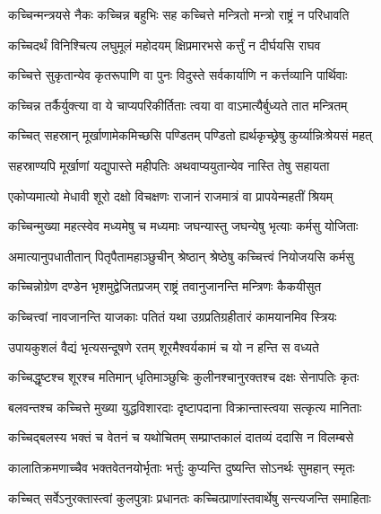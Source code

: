 \twolineshloka
{कच्चिन्मन्त्रयसे नैकः कच्चिन्न बहुभिः सह}
{कच्चित्ते मन्त्रितो मन्त्रो राष्ट्रं न परिधावति} %

\twolineshloka
{कच्चिदर्थं विनिश्चित्य लघुमूलं महोदयम्}
{क्षिप्रमारभसे कर्त्तुं न दीर्घयसि राघव} %

\twolineshloka
{कच्चित्ते सुकृतान्येव कृतरूपाणि वा पुनः}
{विदुस्ते सर्वकार्याणि न कर्त्तव्यानि पार्थिवाः} %

\twolineshloka
{कच्चिन्न तर्कैर्युक्त्या वा ये चाप्यपरिकीर्तिताः}
{त्वया वा वाऽमात्यैर्बुध्यते तात मन्त्रितम्} %

\twolineshloka
{कच्चित् सहस्रान् मूर्खाणामेकमिच्छसि पण्डितम्}
{पण्डितो ह्यर्थकृच्छ्रेषु कुर्य्यान्निःश्रेयसं महत्} %

\twolineshloka
{सहस्राण्यपि मूर्खाणां यद्युपास्ते महीपतिः}
{अथवाप्ययुतान्येव नास्ति तेषु सहायता} %

\twolineshloka
{एकोप्यमात्यो मेधावी शूरो दक्षो विचक्षणः}
{राजानं राजमात्रं वा प्रापयेन्महतीं श्रियम्} %

\twolineshloka
{कच्चिन्मुख्या महत्स्वेव मध्यमेषु च मध्यमाः}
{जघन्यास्तु जघन्येषु भृत्याः कर्मसु योजिताः} %

\twolineshloka
{अमात्यानुपधातीतान् पितृपैतामहाञ्छुचीन्}
{श्रेष्ठान् श्रेष्ठेषु कच्चित्त्वं नियोजयसि कर्मसु} %

\twolineshloka
{कच्चिन्नोग्रेण दण्डेन भृशमुद्वेजितप्रजम्}
{राष्ट्रं तवानुजानन्ति मन्त्रिणः कैकयीसुत} %

\twolineshloka
{कच्चित्त्वां नावजानन्ति याजकाः पतितं यथा}
{उग्रप्रतिग्रहीतारं कामयानमिव स्त्रियः} %

\twolineshloka
{उपायकुशलं वैद्यं भृत्यसन्दूषणे रतम्}
{शूरमैश्वर्यकामं च यो न हन्ति स वध्यते} %

\twolineshloka
{कच्चिद्धृष्टश्च शूरश्च मतिमान् धृतिमाञ्छुचिः}
{कुलीनश्चानुरक्तश्च दक्षः सेनापतिः कृतः} %

\twolineshloka
{बलवन्तश्च कच्चित्ते मुख्या युद्धविशारदाः}
{दृष्टापदाना विक्रान्तास्त्वया सत्कृत्य मानिताः} %

\twolineshloka
{कच्चिद्बलस्य भक्तं च वेतनं च यथोचितम्}
{सम्प्राप्तकालं दातव्यं ददासि न विलम्बसे} %

\twolineshloka
{कालातिक्रमणाच्चैव भक्तवेतनयोर्भृताः}
{भर्त्तुः कुप्यन्ति दुष्यन्ति सोऽनर्थः सुमहान् स्मृतः} %

\twolineshloka
{कच्चित् सर्वेऽनुरक्तास्त्वां कुलपुत्राः प्रधानतः}
{कच्चित्प्राणांस्तवार्थेषु सन्त्यजन्ति समाहिताः} %

